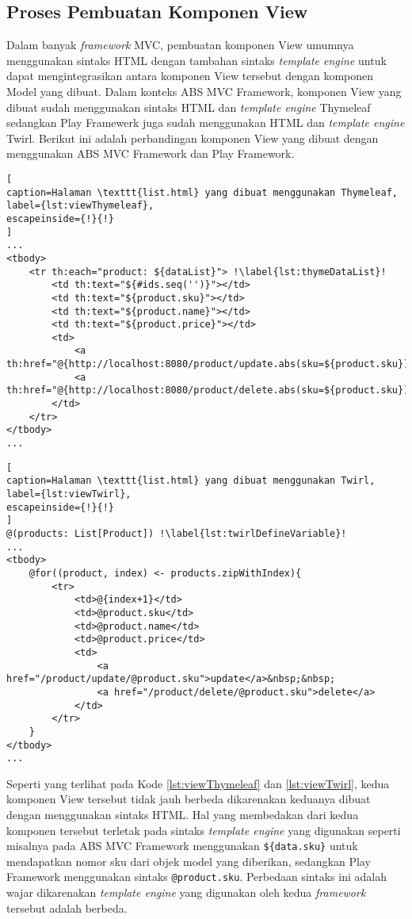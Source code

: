 \subsection{Proses Pembuatan Komponen View}

Dalam banyak \textit{framework} MVC, pembuatan komponen View umumnya menggunakan sintaks HTML dengan tambahan sintaks \textit{template engine} untuk dapat mengintegrasikan antara komponen View tersebut dengan komponen Model yang dibuat. Dalam konteks ABS MVC Framework, komponen View yang dibuat sudah menggunakan sintaks HTML dan \textit{template engine} Thymeleaf sedangkan Play Framewerk juga sudah menggunakan HTML dan \textit{template engine} Twirl. Berikut ini adalah perbandingan komponen View yang dibuat dengan menggunakan ABS MVC Framework dan Play Framework.

\begin{lstlisting}[
caption=Halaman \texttt{list.html} yang dibuat menggunakan Thymeleaf,
label={lst:viewThymeleaf},
escapeinside={!}{!}
]
...
<tbody>
	<tr th:each="product: ${dataList}"> !\label{lst:thymeDataList}!
		<td th:text="${#ids.seq('')}"></td>
		<td th:text="${product.sku}"></td>
		<td th:text="${product.name}"></td>
		<td th:text="${product.price}"></td>
		<td>
			<a th:href="@{http://localhost:8080/product/update.abs(sku=${product.sku})}">update</a>&nbsp;&nbsp;
			<a th:href="@{http://localhost:8080/product/delete.abs(sku=${product.sku})}">delete</a>
		</td>
	</tr>
</tbody>
...
\end{lstlisting}

\begin{lstlisting}[
caption=Halaman \texttt{list.html} yang dibuat menggunakan Twirl,
label={lst:viewTwirl},
escapeinside={!}{!}
]
@(products: List[Product]) !\label{lst:twirlDefineVariable}!
...
<tbody>
	@for((product, index) <- products.zipWithIndex){
		<tr>
			<td>@{index+1}</td>
			<td>@product.sku</td>
			<td>@product.name</td>
			<td>@product.price</td>
			<td>
				<a href="/product/update/@product.sku">update</a>&nbsp;&nbsp;
				<a href="/product/delete/@product.sku">delete</a>
			</td>
		</tr>
	}
</tbody>
...
\end{lstlisting}

Seperti yang terlihat pada Kode \ref{lst:viewThymeleaf} dan \ref{lst:viewTwirl}, kedua komponen View tersebut tidak jauh berbeda dikarenakan keduanya dibuat dengan menggunakan sintaks HTML. Hal yang membedakan dari kedua komponen tersebut terletak pada sintaks \textit{template engine} yang digunakan seperti misalnya pada ABS MVC Framework menggunakan \texttt{\$\{data.sku\}} untuk mendapatkan nomor sku dari objek model yang diberikan, sedangkan Play Framework menggunakan sintaks \texttt{@product.sku}. Perbedaan sintaks ini adalah wajar dikarenakan \textit{template engine} yang digunakan oleh kedua \textit{framework} tersebut adalah berbeda.\\

